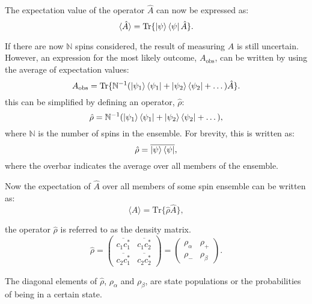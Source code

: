 The expectation value of the operator $\hat{A}$ can now be expressed as:
\begin{equation}
  \langle\hat{A}\rangle = \text{Tr}\{\ket{\psi}\bra{\psi}\hat{A}\}.
\end{equation}

If there are now $\mathbb{N}$ spins considered, the
result of measuring $A$ is still uncertain. However, an expression for the most likely outcome,
$A_{\text{obs}}$, can be written by using the average of expectation values:
\begin{equation}
  A_{\text{obs}} = \text{Tr}\{\mathbb{N}^{-1}(\ket{\psi_1}\bra{\psi_1}+\ket{\psi_2}\bra{\psi_2}+\dots)\hat{A}\}.
\end{equation}
this can be simplified by defining an operator, $\hat{\rho}$:
\begin{equation}
  \hat{\rho} = \mathbb{N}^{-1}(\ket{\psi_1}\bra{\psi_1}+\ket{\psi_2}\bra{\psi_2}+\dots),
\end{equation}
where $\mathbb{N}$ is the number of spins in the ensemble. For brevity,
this is written as:
\begin{equation}
  \hat{\rho} = \overline{\ket{\psi}\bra{\psi}},
\end{equation}
where the overbar indicates the average over all members of the ensemble.

Now the expectation of $\hat{A}$ over all members of some spin ensemble can be written as:
\begin{equation}
  \langle{A}\rangle = \text{Tr}\{\hat{\rho}\hat{A}\},
\end{equation}

the operator $\hat{\rho}$ is referred to as the density matrix.
\begin{equation}\label{eqn:density}
  \hat{\rho} = \begin{pmatrix}
      \overline{c_1c_1^*} & \overline{c_1c_2^*}\\
      \overline{c_2c_1^*} & \overline{c_2c_2^*}
  \end{pmatrix} = \begin{pmatrix}
      \rho_\alpha & \rho_+\\
      \rho_- & \rho_\beta
  \end{pmatrix}.
\end{equation}

The diagonal elements of $\hat{\rho}$, $\rho_\alpha$ and $\rho_\beta$, are state populations or the probabilities of being in a certain state.

